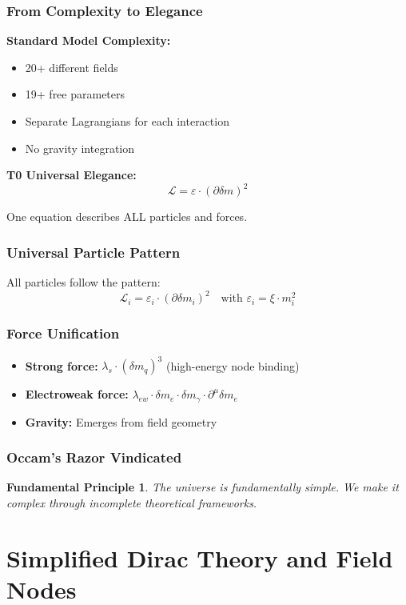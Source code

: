 \documentclass[12pt,a4paper]{report}
\newtheorem{principle}{Fundamental Principle}[chapter]
\begin{document}
	\subsubsection{From Complexity to Elegance}
	\textbf{Standard Model Complexity:}
	\begin{itemize}
		\item 20+ different fields
		\item 19+ free parameters
		\item Separate Lagrangians for each interaction
		\item No gravity integration
	\end{itemize}
	
	\textbf{T0 Universal Elegance:}
	$$\mathcal{L} = \varepsilon \cdot (\partial \delta m)^2$$
	
	One equation describes ALL particles and forces.
	
	\subsubsection{Universal Particle Pattern}
	All particles follow the pattern:
	$$\mathcal{L}_i = \varepsilon_i \cdot (\partial \delta m_i)^2 \quad \text{with } \varepsilon_i = \xi \cdot m_i^2$$
	
	\subsubsection{Force Unification}
	\begin{itemize}
		\item \textbf{Strong force:} $\lambda_s \cdot (\delta m_q)^3$ (high-energy node binding)
		\item \textbf{Electroweak force:} $\lambda_{ew} \cdot \delta m_e \cdot \delta m_\gamma \cdot \partial^\mu \delta m_e$
		\item \textbf{Gravity:} Emerges from field geometry
	\end{itemize}
	
	\subsubsection{Occam's Razor Vindicated}
	\begin{principle}
		The universe is fundamentally simple. We make it complex through incomplete theoretical frameworks.
	\end{principle}
	
	\section{Simplified Dirac Theory and Field Nodes}
\end{document}
